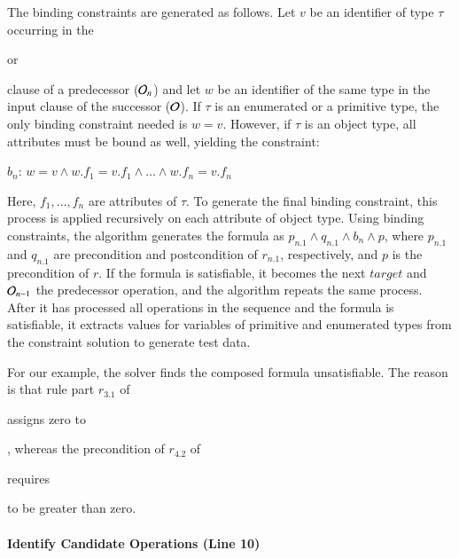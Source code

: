 The binding constraints are generated as follows. Let $v$ be an identifier of
type $\tau$ occurring in the \subject{creates} or \subject{modifies} clause of a
predecessor (\eg ${\cal O}_n$) and let $w$ be an identifier of the same type in
the input clause of the successor (\eg ${\cal O}$). If $\tau$ is an enumerated
or a primitive type, the only binding constraint needed is $w = v$. However, if
$\tau$ is an object type, all attributes must be bound as well, yielding the
constraint:

\vskip 2pt
$b_n$: $w = v \wedge w.f_1 = v.f_1 \wedge \ldots \wedge w.f_n = v.f_n$ 
\vskip 2pt

Here, $f_1, \ldots , f_n$ are attributes of $\tau$. To generate the final
binding constraint, this process is applied recursively on each attribute of
object type. Using binding constraints, the algorithm generates the formula as
$p_{n.1} \wedge q_{n.1} \wedge b_n \wedge p$, where $p_{n.1}$ and $q_{n.1}$ are
precondition and postcondition of $r_{n.1}$, respectively, and $p$ is the
precondition of $r$. If the formula
is satisfiable, it becomes the next $target$ and ${\cal O}_{n-1}$ the
predecessor operation, and the algorithm repeats the same process. After it has
processed all operations in the sequence and the formula is satisfiable, it
extracts values for variables of primitive and enumerated types from the
constraint solution to generate test data.

For our example, the solver finds the composed formula unsatisfiable. The reason
is that rule part $r_{3.1}$ of \subject{CreateOrder} assigns zero to
\subject{Order.total}, whereas the precondition of $r_{4.2}$ of
\subject{GenerateInvoice} requires \subject{total} to be greater than zero.



\paragraph*{Identify Candidate Operations (Line 10)}

